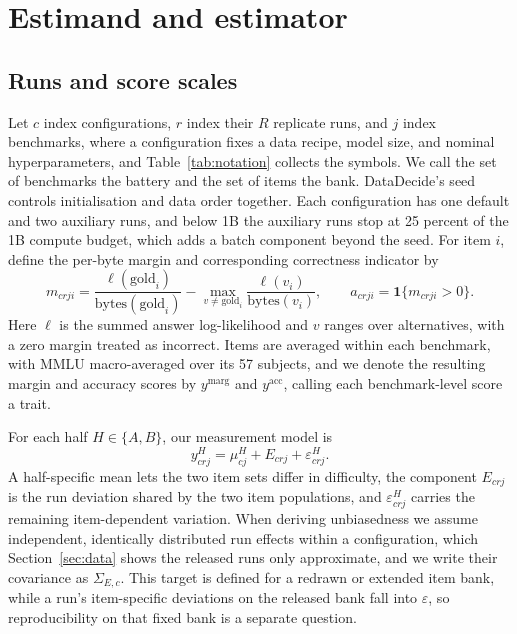\section{Estimand and estimator}
\label{sec:estimator}
\subsection{Runs and score scales}
Let $c$ index configurations, $r$ index their $R$ replicate runs, and $j$ index benchmarks, where a configuration fixes a data recipe, model size, and nominal hyperparameters, and Table~\ref{tab:notation} collects the symbols. We call the set of benchmarks the battery and the set of items the bank. DataDecide's seed controls initialisation and data order together. Each configuration has one default and two auxiliary runs, and below 1B the auxiliary runs stop at 25 percent of the 1B compute budget, which adds a batch component beyond the seed. For item $i$, define the per-byte margin and corresponding correctness indicator by
\begin{equation}
m_{crji}=\frac{\ell(\mathrm{gold}_i)}{\mathrm{bytes}(\mathrm{gold}_i)}-
\max_{v\ne\mathrm{gold}_i}\frac{\ell(v_i)}{\mathrm{bytes}(v_i)},
\qquad a_{crji}=\mathbf{1}\{m_{crji}>0\}.
\label{eq:scores}
\end{equation}
Here $\ell$ is the summed answer log-likelihood and $v$ ranges over alternatives, with a zero margin treated as incorrect. Items are averaged within each benchmark, with MMLU macro-averaged over its 57 subjects, and we denote the resulting margin and accuracy scores by $y^{\mathrm{marg}}$ and $y^{\mathrm{acc}}$, calling each benchmark-level score a trait.

For each half $H\in\{A,B\}$, our measurement model is
\begin{equation}
y^H_{crj}=\mu^H_{cj}+E_{crj}+\varepsilon^H_{crj}.
\label{eq:model}
\end{equation}
A half-specific mean lets the two item sets differ in difficulty, the component $E_{crj}$ is the run deviation shared by the two item populations, and $\varepsilon^H_{crj}$ carries the remaining item-dependent variation. When deriving unbiasedness we assume independent, identically distributed run effects within a configuration, which Section~\ref{sec:data} shows the released runs only approximate, and we write their covariance as $\Sigma_{E,c}$. This target is defined for a redrawn or extended item bank, while a run's item-specific deviations on the released bank fall into $\varepsilon$, so reproducibility on that fixed bank is a separate question.

